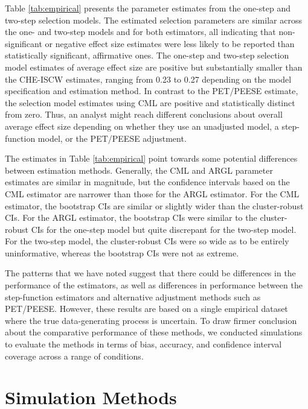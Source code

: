 \documentclass[
  man, donotrepeattitle,floatsintext]{apa7}
\begin{document}
Table \ref{tab:empirical} presents the parameter estimates from the one-step and two-step selection models.
The estimated selection parameters are similar across the one- and two-step models and for both estimators, all indicating that non-significant or negative effect size estimates were less likely to be reported than statistically significant, affirmative ones.
The one-step and two-step selection model estimates of average effect size are positive but substantially smaller than the CHE-ISCW estimates, ranging from 0.23 to 0.27 depending on the model specification and estimation method.
In contrast to the PET/PEESE estimate, the selection model estimates using CML are positive and statistically distinct from zero.
Thus, an analyst might reach different conclusions about overall average effect size depending on whether they use an unadjusted model, a step-function model, or the PET/PEESE adjustment.

The estimates in Table \ref{tab:empirical} point towards some potential differences between estimation methods.
Generally, the CML and ARGL parameter estimates are similar in magnitude, but the confidence intervals based on the CML estimator are narrower than those for the ARGL estimator.
For the CML estimator, the bootstrap CIs are similar or slightly wider than the cluster-robust CIs.
For the ARGL estimator, the bootstrap CIs were similar to the cluster-robust CIs for the one-step model but quite discrepant for the two-step model.
For the two-step model, the cluster-robust CIs were so wide as to be entirely uninformative, whereas the bootstrap CIs were not as extreme.

The patterns that we have noted suggest that there could be differences in the performance of the estimators, as well as differences in performance between the step-function estimators and alternative adjustment methods such as PET/PEESE.
However, these results are based on a single empirical dataset where the true data-generating process is uncertain.
To draw firmer conclusion about the comparative performance of these methods, we conducted simulations to evaluate the methods in terms of bias, accuracy, and confidence interval coverage across a range of conditions.

\section{Simulation Methods}\label{simulation-methods}
\end{document}
